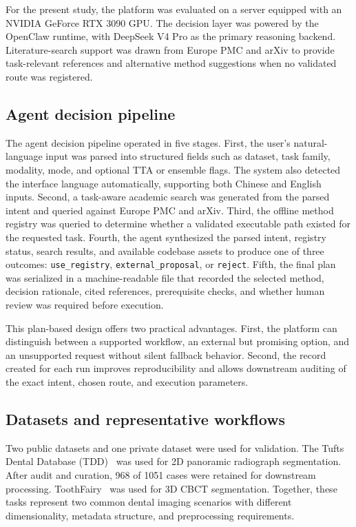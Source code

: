\documentclass[final,5p,times,twocolumn]{elsarticle}
\begin{document}
For the present study, the platform was evaluated on a server equipped with an NVIDIA GeForce RTX 3090 GPU. The decision layer was powered by the OpenClaw runtime, with DeepSeek V4 Pro as the primary reasoning backend. Literature-search support was drawn from Europe PMC and arXiv to provide task-relevant references and alternative method suggestions when no validated route was registered.

\subsection{Agent decision pipeline}
The agent decision pipeline operated in five stages. First, the user's natural-language input was parsed into structured fields such as dataset, task family, modality, mode, and optional TTA or ensemble flags. The system also detected the interface language automatically, supporting both Chinese and English inputs. Second, a task-aware academic search was generated from the parsed intent and queried against Europe PMC and arXiv. Third, the offline method registry was queried to determine whether a validated executable path existed for the requested task. Fourth, the agent synthesized the parsed intent, registry status, search results, and available codebase assets to produce one of three outcomes: \texttt{use\_registry}, \texttt{external\_proposal}, or \texttt{reject}. Fifth, the final plan was serialized in a machine-readable file that recorded the selected method, decision rationale, cited references, prerequisite checks, and whether human review was required before execution.

This plan-based design offers two practical advantages. First, the platform can distinguish between a supported workflow, an external but promising option, and an unsupported request without silent fallback behavior. Second, the record created for each run improves reproducibility and allows downstream auditing of the exact intent, chosen route, and execution parameters.

\subsection{Datasets and representative workflows}
Two public datasets and one private dataset were used for validation. The Tufts Dental Database (TDD)~\cite{panetta2022tufts} was used for 2D panoramic radiograph segmentation. After audit and curation, 968 of 1051 cases were retained for downstream processing. ToothFairy~\cite{ToothFairyDataset1,ToothFairyDataset2,ToothFairyDataset3} was used for 3D CBCT segmentation. Together, these tasks represent two common dental imaging scenarios with different dimensionality, metadata structure, and preprocessing requirements.
\end{document}
